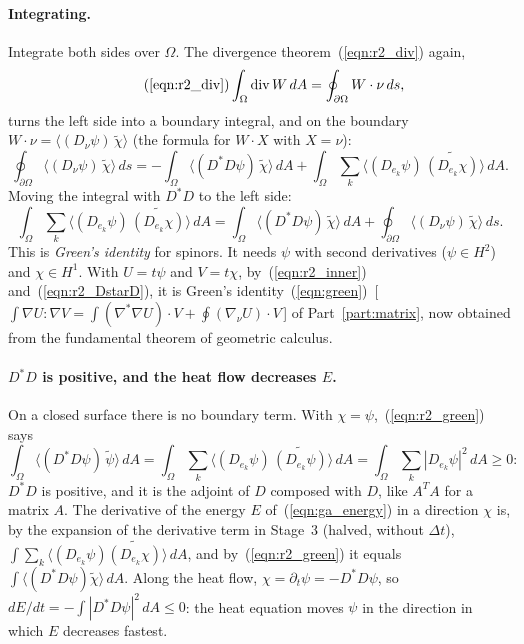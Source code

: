 \paragraph{Integrating.} Integrate both sides over $\Omega$. The divergence theorem~(\ref{eqn:r2_div}) again,
\begin{equation*}
\tag{\ref{eqn:r2_div}}
\int_\Omega \operatorname{div} W\, dA = \oint_{\partial\Omega} W\cdot\nu\, ds ,
\end{equation*}
turns the left side into a boundary integral, and on the boundary $W\cdot\nu = \langle (D_\nu\psi)\,\widetilde\chi\rangle$ (the formula for $W\cdot X$ with $X = \nu$):
\begin{equation*}
\oint_{\partial\Omega} \big\langle (D_\nu\psi)\,\widetilde\chi\big\rangle\, ds = -\int_\Omega\big\langle (D^*D\psi)\,\widetilde\chi\big\rangle\, dA + \int_\Omega\sum_k\big\langle (D_{e_k}\psi)\,\widetilde{(D_{e_k}\chi)}\big\rangle\, dA .
\end{equation*}
Moving the integral with $D^*D$ to the left side:
\begin{equation}
\label{eqn:r2_green}
\int_\Omega \sum_k \big\langle (D_{e_k}\psi)\,\widetilde{(D_{e_k}\chi)}\big\rangle\, dA = \int_\Omega \big\langle (D^*D\psi)\,\widetilde\chi\big\rangle\, dA + \oint_{\partial\Omega} \big\langle (D_\nu\psi)\,\widetilde\chi\big\rangle\, ds .
\end{equation}
This is \emph{Green's identity} for spinors. It needs $\psi$ with second derivatives ($\psi \in H^2$) and $\chi \in H^1$. With $U = t\psi$ and $V = t\chi$, by~(\ref{eqn:r2_inner}) and~(\ref{eqn:r2_DstarD}), it is Green's identity~(\ref{eqn:green})~[\,$\int\nabla U:\nabla V = \int(\nabla^*\nabla U)\cdot V + \oint(\nabla_\nu U)\cdot V$\,] of Part~\ref{part:matrix}, now obtained from the fundamental theorem of geometric calculus.

\paragraph{$D^*D$ is positive, and the heat flow decreases $E$.} On a closed surface there is no boundary term. With $\chi = \psi$,~(\ref{eqn:r2_green}) says
\begin{equation*}
\int_\Omega\big\langle (D^*D\psi)\,\widetilde\psi\big\rangle\, dA = \int_\Omega\sum_k\big\langle (D_{e_k}\psi)\,\widetilde{(D_{e_k}\psi)}\big\rangle\, dA = \int_\Omega\sum_k|D_{e_k}\psi|^2\, dA \ge 0 :
\end{equation*}
$D^*D$ is positive, and it is the adjoint of $D$ composed with $D$, like $A^TA$ for a matrix $A$. The derivative of the energy $E$ of~(\ref{eqn:ga_energy}) in a direction $\chi$ is, by the expansion of the derivative term in Stage~3 (halved, without $\Delta t$), $\int\sum_k\langle (D_{e_k}\psi)\widetilde{(D_{e_k}\chi)}\rangle\, dA$, and by~(\ref{eqn:r2_green}) it equals $\int\langle (D^*D\psi)\widetilde\chi\rangle\, dA$. Along the heat flow, $\chi = \partial_t\psi = -D^*D\psi$, so $dE/dt = -\int|D^*D\psi|^2\, dA \le 0$: the heat equation moves $\psi$ in the direction in which $E$ decreases fastest.

